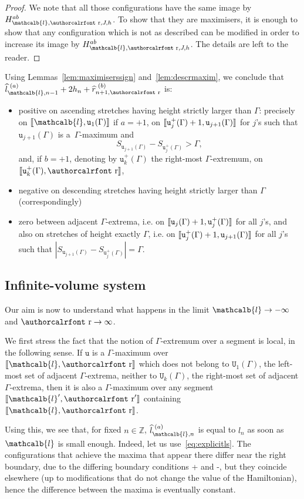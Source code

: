 \documentclass[10pt]{amsart}
\theoremstyle{definition}\newtheorem{defi}[theo]{Definition}\newtheorem{rema}[theo]{Remark}\newtheorem{exam}[theo]{Example}\newtheorem{exem}[theo]{Example}\newtheorem{nota}[theo]{Notation}
\newcommand{\mathcalc}[1]{\text{\authorcalrfont #1}}
\newcommand{\Z}{\mathbb{Z}}
\newcommand{\gG}{\Gamma}
\renewcommand*\ss{\mathtt{u}}
\newcommand{\tu}{\ss}
\newcommand{\tU}{\mathtt{U}}
\newcommand{\ls}{\widehat{l}}
\newcommand{\rs}{\widehat{r}}
\renewcommand{\ell}{\mathcalb{l}}
\newcommand{\err}{\mathcalc{r}}
\newcommand{\llbracket}{\mathopen{[\mkern -2.7mu[}}
\newcommand{\rrbracket}{\mathclose{]\mkern -2.7mu]}}
\newcommand{\lbra}{\llbracket}
\newcommand{\rbra}{\rrbracket}
\renewcommand*{\to}{\mathchoice{\longrightarrow}{\rightarrow}{\rightarrow}{\rightarrow}}
\begin{document}
\begin{proof}
We note that all those configurations have the same image by $H_{\ell, \err, J, h}^{ab}$. To show that they are maximisers, it is enough to show that any configuration which is not as described can be modified in order to increase its image by $H_{\ell, \err, J, h}^{ab}$. The details are left to the reader.
\end{proof}

Using Lemmas~\ref{lem:maximiserssign} and~\ref{lem:descrmaxim}, we conclude that $\ls_{\ell, n-1}^{\,\,(a)}+2 h_n + \rs_{n+1, \err}^{\,\,(b)}$ is:
\begin{itemize}
\item positive on ascending stretches having height strictly larger than $\gG$: precisely on $\lbra \ell, \tu_1(\gG)\rbra$ if $a=+1$, on $\lbra\tu_j^+(\gG)+1, \tu_{j+1}(\gG)\rbra$ for $j$'s such that $\tu_{j+1}(\gG)$ is a~$\gG$-maximum and 
\[
S_{\tu_{j+1}(\gG)}-S_{\tu_j^+(\gG)}>\gG,
\]
and, if $b=+1$, denoting by $\tu_k^+(\gG)$ the right-most $\gG$-extremum, on $\lbra \tu_k^+(\gG), \err\rbra$,
\item negative on descending stretches having height strictly larger than $\gG$ (correspondingly)
\item zero between adjacent $\gG$-extrema, i.e. on $\lbra\tu_j(\gG)+1, \tu_j^+(\gG)\rbra$ for all $j$'s, and also on stretches of height exactly $\gG$, i.e. on $\lbra\tu_j^+(\gG)+1, \tu_{j+1}(\gG)\rbra$ for all $j$'s such that $| S_{\tu_{j+1}(\gG)}-S_{\tu_j^+(\gG)}|=\gG $.
\end{itemize}

\subsection{Infinite-volume system}

Our aim is now to understand what happens in the limit $\ell\to -\infty$ and $\err\to \infty$.

We first stress the fact that the notion of $\gG$-extremum over a segment is local, in the following sense. If $\tu$ is a $\gG$-maximum over $\lbra\ell, \err\rbra$ which does not belong to $\tU_1(\gG)$, the left-most set of adjacent $\gG$-extrema, neither to $\tU_k(\gG)$, the right-most set of adjacent $\gG$-extrema, then it is also a $\gG$-maximum over any segment $\lbra\ell', \err'\rbra$ containing~$\lbra\ell, \err\rbra$.

Using this, we see that, for fixed $n\in \Z$, $\ls_{\ell, n}^{\,\,(a)}$ is equal to $\ls_n$ as soon as $\ell$ is small enough. Indeed, let us use~\eqref{eq:explicitls}. The configurations that achieve the maxima that appear there differ near the right boundary, due to the differing boundary conditions + and -, but they coincide elsewhere (up to modifications that do not change the value of the Hamiltonian), hence the difference between the maxima is eventually constant.
\end{document}
